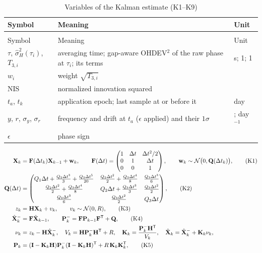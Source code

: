 \documentclass[11pt,a4paper]{article}
\makeatletter
\renewcommand{\_}{\usscore\allowbreak}
\newenvironment{vartable}[2]{%
 \par\small\setlength{\LTpre}{3pt}\setlength{\LTpost}{3pt}%
 \begin{longtable}{@{}>{\raggedright}p{.2\linewidth}>{\raggedright}p{.57\linewidth}>{\raggedright\arraybackslash}p{.17\linewidth}@{}}
 \caption{#2}\label{#1}\\
 \toprule Symbol & Meaning & Unit\\\midrule
 \endfirsthead
 \multicolumn{3}{@{}l}{\footnotesize\itshape Table \thetable{} (continued)}\\
 \toprule Symbol & Meaning & Unit\\\midrule
 \endhead
 \bottomrule
 \endlastfoot}
 {\end{longtable}\normalsize}
\makeatother
\begin{document}
\begin{vartable}{tab:var-K}{Variables of the Kalman estimate (K1--K9)}
\(\tau\), \(\hat\sigma_H^2(\tau_i)\), \(T_{3,i}\) & averaging time; gap-aware OHDEV\(^2\) of the raw phase at \(\tau_i\); its terms & s; 1; 1\\
\(w_i\) & weight \(\sqrt{T_{3,i}}\) & 1\\
NIS & normalized innovation squared & 1\\
\(t_a\), \(t_k\) & application epoch; last sample at or before it & day\\
\(y\), \(r\), \(\sigma_y\), \(\sigma_r\) & frequency and drift at \(t_a\) (\(\epsilon\) applied) and their \(1\sigma\) & 1; day\(^{-1}\)\\
\(\epsilon\) & phase sign & 1\\
\end{vartable}
\begin{align}
\mathbf X_k&=\mathbf F(\Delta t_k)\mathbf X_{k-1}+\mathbf w_k,\qquad
\mathbf F(\Delta t)=\begin{pmatrix}1&\Delta t&\Delta t^2/2\\0&1&\Delta t\\0&0&1\end{pmatrix},\qquad
\mathbf w_k\sim\mathcal N\bigl(0,\mathbf Q(\Delta t_k)\bigr), \tag{K1}\label{eq:K1}\\
\mathbf Q(\Delta t)&=\begin{pmatrix}
Q_1\Delta t+\frac{Q_2\Delta t^3}{3}+\frac{Q_3\Delta t^5}{20} & \frac{Q_2\Delta t^2}{2}+\frac{Q_3\Delta t^4}{8} & \frac{Q_3\Delta t^3}{6}\\[3pt]
\frac{Q_2\Delta t^2}{2}+\frac{Q_3\Delta t^4}{8} & Q_2\Delta t+\frac{Q_3\Delta t^3}{3} & \frac{Q_3\Delta t^2}{2}\\[3pt]
\frac{Q_3\Delta t^3}{6} & \frac{Q_3\Delta t^2}{2} & Q_3\Delta t\end{pmatrix}, \tag{K2}\label{eq:K2}\\
z_k&=\mathbf H\mathbf X_k+v_k,\qquad v_k\sim\mathcal N(0,R), \tag{K3}\label{eq:K3}\\
\hat{\mathbf X}_k^-&=\mathbf F\hat{\mathbf X}_{k-1},\qquad
\mathbf P_k^-=\mathbf F\mathbf P_{k-1}\mathbf F^{\mathsf T}+\mathbf Q, \tag{K4}\label{eq:K4}\\
\nu_k&=z_k-\mathbf H\hat{\mathbf X}_k^-,\quad V_k=\mathbf H\mathbf P_k^-\mathbf H^{\mathsf T}+R,\quad
\mathbf K_k=\frac{\mathbf P_k^-\mathbf H^{\mathsf T}}{V_k},\quad
\hat{\mathbf X}_k=\hat{\mathbf X}_k^-+\mathbf K_k\nu_k, \notag\\
\mathbf P_k&=(\mathbf I-\mathbf K_k\mathbf H)\mathbf P_k^-(\mathbf I-\mathbf K_k\mathbf H)^{\mathsf T}+R\,\mathbf K_k\mathbf K_k^{\mathsf T}, \tag{K5}\label{eq:K5}\\

\end{align}
\end{document}
